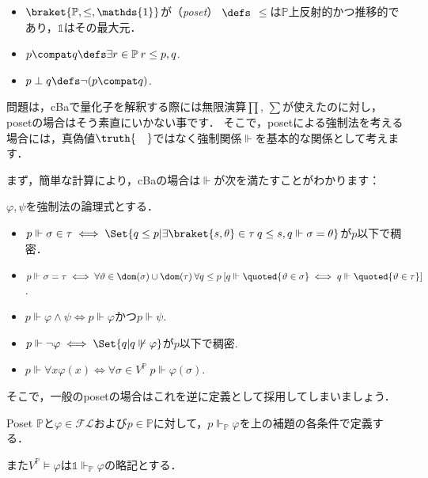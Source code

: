 \documentclass[a4j]{ltjsarticle}
\renewcommand{\emph}[1]{\textbf{\textgt{#1}}}
\newcommand{\FL}{\mathord{\mathcal{F\!L}}}
\begin{document}
\begin{definition}
\begin{itemize}
 \item $\braket{\mathbb{P}, \leq, \mathds{1}}$が\emph{擬順序集合}（\textit{poset}）
 $\defs$ $\leq$は$\mathbb{P}$上反射的かつ推移的であり，$\mathds{1}$はその最大元．
 \item $p \compat q \defs \exists r \in \mathbb{P} \: r \leq p, q$.
 \item $p \perp q \defs \neg (p \compat q)$.
\end{itemize}
\end{definition}

問題は，cBaで量化子を解釈する際には無限演算$\prod$, $\sum$が使えたのに対し，posetの場合はそう素直にいかない事です．
そこで，posetによる強制法を考える場合には，真偽値$\truth{\quad}$ではなく強制関係$\Vdash$を基本的な関係として考えます．

まず，簡単な計算により，cBaの場合は$\Vdash$が次を満たすことがわかります：

\begin{lemma}
 $\varphi, \psi$を強制法の論理式とする．
 \begin{itemize}
  \item $p \Vdash \sigma \in \tau \iff \Set{ q \leq p | \exists \braket{s, \theta} \in \tau \: q \leq s, q \Vdash \sigma = \theta}$が$p$以下で稠密．
  \item $p \Vdash \sigma = \tau \iff \forall \vartheta \in \dom(\sigma) \cup \dom(\tau)\:\forall q \leq p \: [ q \Vdash \quoted{\vartheta \in \sigma} \iff q \Vdash \quoted{\vartheta \in \tau} ]$.
  \item $p \Vdash \varphi \wedge \psi \iff  p \Vdash \varphi$かつ$p \Vdash \psi$.
  \item $p \Vdash \neg \varphi \iff \Set{q | q \not\Vdash \varphi}$が$p$以下で稠密.
  \item $p \Vdash \forall x \varphi(x) \iff \forall \sigma \in V^{\mathbb{P}} \: p \Vdash \varphi(\sigma)$.
 \end{itemize}
\end{lemma}

そこで，一般のposetの場合はこれを逆に定義として採用してしまいましょう．

\begin{definition}
 Poset $\mathbb{P}$と$\varphi \in \FL$および$p \in \mathbb{P}$に対して，$p \Vdash_{\mathbb{P}} \varphi$を上の補題の各条件で定義する．

 また$V^{\mathbb{P}} \models \varphi$は$\mathds{1} \Vdash_{\mathbb{P}} \varphi$の略記とする．
\end{definition}
\end{document}
